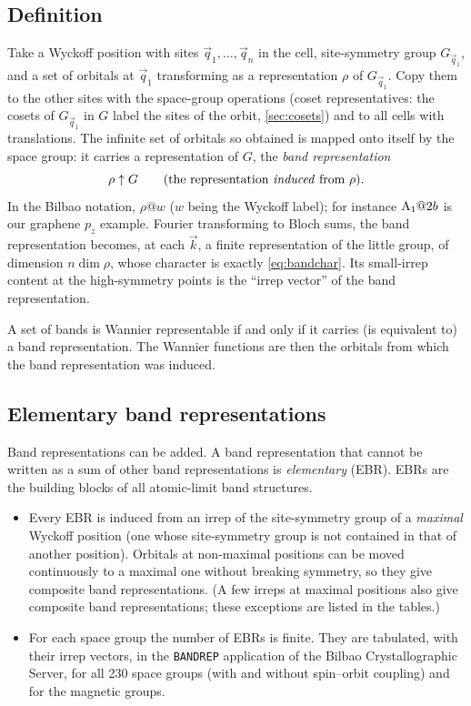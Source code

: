 \subsection{Definition}
Take a Wyckoff position with sites $\vec{q}_1,\dots,\vec{q}_n$ in the cell,
site-symmetry group $G_{\vec{q}_1}$, and a set of orbitals at $\vec{q}_1$ transforming as
a representation $\rho$ of $G_{\vec{q}_1}$. Copy them to the other sites with the
space-group operations (coset representatives: the cosets of $G_{\vec{q}_1}$ in $G$
label the sites of the orbit, \cref{sec:cosets}) and to all cells with translations.
The infinite set of orbitals so obtained is mapped onto itself by the space group:
it carries a representation of $G$, the \emph{band representation}
\begin{equation}
\rho\uparrow G\qquad\text{(the representation \emph{induced} from $\rho$)}.
\end{equation}
In the Bilbao notation, $\rho@w$ ($w$ being the Wyckoff label); for instance
$\mathrm{A}_1@2b$ is our graphene $p_z$ example. Fourier transforming to Bloch sums, the
band representation becomes, at each $\vec{k}$, a finite representation of the little
group, of dimension $n\dim\rho$, whose character is exactly
\eqref{eq:bandchar}. Its small-irrep content at the high-symmetry points is
the ``irrep vector'' of the band representation.

A set of bands is Wannier representable if and only if it carries (is equivalent to)
a band representation. The Wannier functions are then the orbitals from which the
band representation was induced.

\subsection{Elementary band representations}
Band representations can be added. A band representation that cannot be written as a
sum of other band representations is \emph{elementary} (EBR). EBRs are the building
blocks of all atomic-limit band structures.
\begin{itemize}
\item Every EBR is induced from an irrep of the site-symmetry group of a \emph{maximal}
      Wyckoff position (one whose site-symmetry group is not contained in that of
      another position). Orbitals at non-maximal positions can be moved continuously
      to a maximal one without breaking symmetry, so they give composite band
      representations. (A few irreps at maximal positions also give composite band
      representations; these exceptions are listed in the tables.)
\item For each space group the number of EBRs is finite. They are tabulated, with
      their irrep vectors, in the \texttt{BANDREP} application of the Bilbao
      Crystallographic Server, for all 230 space groups (with and without spin--orbit
      coupling) and for the magnetic groups.
\end{itemize}

